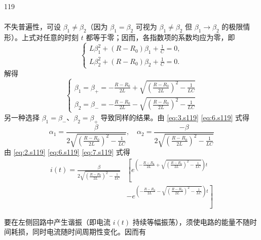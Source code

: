 \begin{solution}{119}
\begin{subsolution}
\begin{align}
        \end{align}
        不失普遍性，可设 $\beta_{1} \neq \beta_{2}$（因为 $\beta_{1} = \beta_{2}$ 可视为 $\beta_{1} \neq \beta_{2}$ 但 $\beta_{1} \rightarrow \beta_{2}$ 的极限情形）。上式对任意的时刻 $t$ 都等于零；因而，各指数项的系数均应为零，即
        \begin{equation}
            \left\{ \begin{array}{l} L \beta_{1}^{2} + (R - R_{0}) \beta_{1} + \frac{1}{C} = 0, \\ L \beta_{2}^{2} + (R - R_{0}) \beta_{2} + \frac{1}{C} = 0. \end{array} \right.
            \label{eq:5.s119}
        \end{equation}
        解得
        \begin{equation}
            \left\{ \begin{array}{l} \beta_{1} = \beta_{+} = -\frac{R - R_{0}}{2L} + \sqrt{\left(\frac{R - R_{0}}{2L}\right)^{2} - \frac{1}{LC}} \\ \beta_{2} = \beta_{-} = -\frac{R - R_{0}}{2L} - \sqrt{\left(\frac{R - R_{0}}{2L}\right)^{2} - \frac{1}{LC}} \end{array} \right.
            \label{eq:6.s119}
        \end{equation}
        另一种选择 $\beta_{1} = \beta_{-}$、$\beta_{2} = \beta_{+}$ 导致同样的结果。由 \eqref{eq:3.s119} \eqref{eq:6.s119} 式得
        \begin{equation}
            \alpha_{1} = \frac{\beta}{2 \sqrt{\left(\frac{R - R_{0}}{2L}\right)^{2} - \frac{1}{LC}}}, \quad \alpha_{2} = \frac{-\beta}{2 \sqrt{\left(\frac{R - R_{0}}{2L}\right)^{2} - \frac{1}{LC}}}
            \label{eq:7.s119}
        \end{equation}
        由 \eqref{eq:2.s119} \eqref{eq:6.s119} \eqref{eq:7.s119} 式得
        \begin{align}
            i(t) = \frac{\beta}{2 \sqrt{\left(\frac{R - R_{0}}{2L}\right)^{2} - \frac{1}{LC}}} & \left[ e^{\left(-\frac{R - R_{0}}{2L} + \sqrt{\left(\frac{R - R_{0}}{2L}\right)^{2} - \frac{1}{LC}}\right) t} \right. \nonumber \\
            & \left. - e^{\left(-\frac{R - R_{0}}{2L} - \sqrt{\left(\frac{R - R_{0}}{2L}\right)^{2} - \frac{1}{LC}}\right) t} \right]
            \label{eq:8.s119}
        \end{align}
    \end{subsolution}
    \begin{subsolution}
        要在左侧回路中产生谐振（即电流 $i(t)$ 持续等幅振荡），须使电路的能量不随时间耗损，同时电流随时间周期性变化。因而有

\end{subsolution}
\end{solution}
